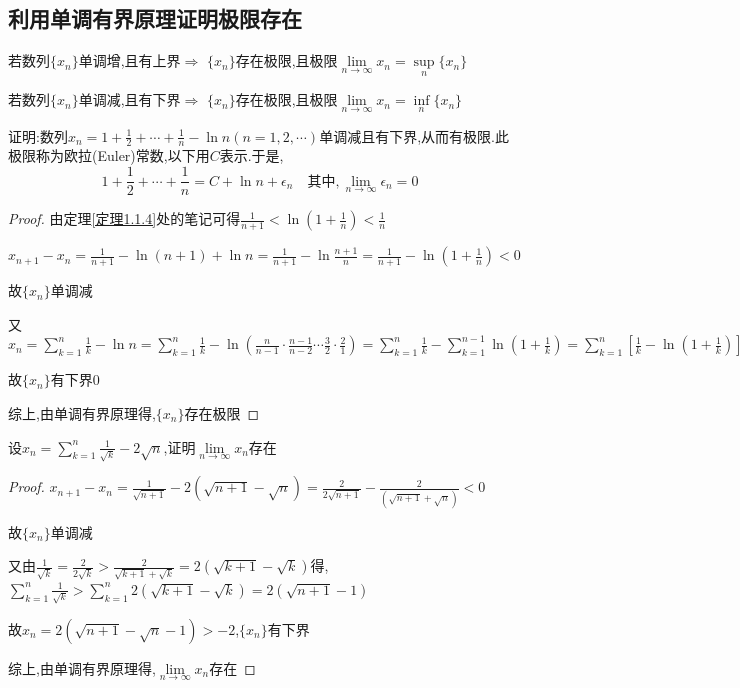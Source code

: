 \subsection{利用单调有界原理证明极限存在}

\begin{theorem}[单调有界原理]
    若数列$\{x_n\}$单调增,且有上界$\Longrightarrow$ $\{x_n\}$存在极限,且极限$\lim \limits_{n \to \infty} x_n = \underset{n}{\sup} \{x_n\}$

    若数列$\{x_n\}$单调减,且有下界$\Longrightarrow$ $\{x_n\}$存在极限,且极限$\lim \limits_{n \to \infty} x_n = \underset{n}{\inf} \{x_n\}$
\end{theorem}

\begin{example}
    证明:数列$x_n=1+\frac{1}{2}+\cdots+\frac{1}{n}-\ln n(n=1,2,\cdots)$单调减且有下界,从而有极限.此极限称为欧拉(Euler)常数,以下用$C$表示.于是,
    $$1+\frac{1}{2}+\cdots+\frac{1}{n} = C + \ln n +\epsilon_n \quad \mbox{其中}, \lim \limits_{n \to \infty} \epsilon_n = 0$$
\end{example}

\begin{proof}

    由定理\ref{定理1.1.4}处的笔记可得$\frac{1}{n+1}<\ln(1+\frac{1}{n})<\frac{1}{n}$

    $x_{n+1}-x_n=\frac{1}{n+1}-\ln (n+1)+\ln n
        =\frac{1}{n+1}-\ln \frac{n+1}{n}
        =\frac{1}{n+1}-\ln (1+\frac{1}{n})<0$

    故$\{x_n\}$单调减

    又$x_n=\sum\limits_{k=1}^{n} \frac{1}{k}-\ln n
        =\sum\limits_{k=1}^{n} \frac{1}{k}-\ln  (\frac{n}{n-1} \cdot \frac{n-1}{n-2} \cdots \frac{3}{2} \cdot \frac{2}{1})
        =\sum\limits_{k=1}^{n} \frac{1}{k}-\sum\limits_{k=1}^{n-1}\ln (1+\frac{1}{k})
        =\sum\limits_{k=1}^{n} [\frac{1}{k}-\ln (1+\frac{1}{k})]+\frac{1}{n}>\frac{1}{n}>0$

    故$\{x_n\}$有下界0

    综上,由单调有界原理得,$\{x_n\}$存在极限
\end{proof}

\begin{example}
    设$x_n=\sum\limits_{k=1}^{n} \frac{1}{\sqrt{k}}-2\sqrt{n}$,证明$\lim \limits_{n \to \infty} x_n$存在
\end{example}

\begin{proof}

    $x_{n+1}-x_n
        =\frac{1}{\sqrt{n+1}}-2(\sqrt{n+1}-\sqrt{n})
        =\frac{2}{2\sqrt{n+1}}-\frac{2}{(\sqrt{n+1}+\sqrt{n})}<0$

    故$\{x_n\}$单调减

    又由$\frac{1}{\sqrt{k}}=\frac{2}{2\sqrt{k}}>\frac{2}{\sqrt{k+1}+\sqrt{k}}=2(\sqrt{k+1}-\sqrt{k})$得,$\sum\limits_{k=1}^{n} \frac{1}{\sqrt{k}}>\sum\limits_{k=1}^{n} 2(\sqrt{k+1}-\sqrt{k})=2(\sqrt{n+1}-1)$

    故$x_n=2(\sqrt{n+1}-\sqrt{n}-1)>-2$,\quad$\{x_n\}$有下界

    综上,由单调有界原理得,$\lim \limits_{n \to \infty} x_n$存在
\end{proof}

